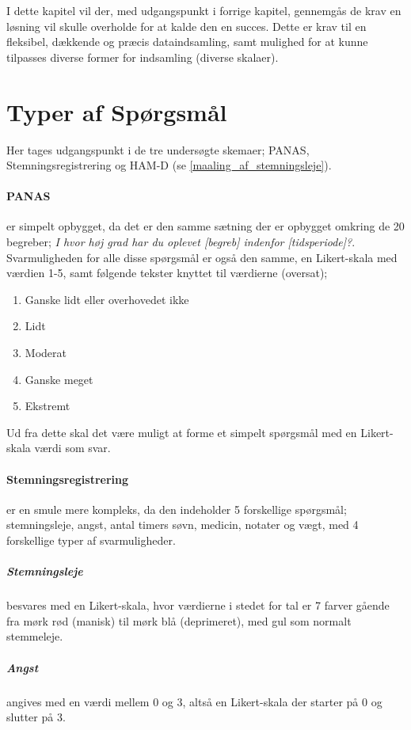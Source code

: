 I dette kapitel vil der, med udgangspunkt i forrige kapitel, gennemgås de krav en løsning vil skulle overholde for at kalde den en succes.
Dette er krav til en fleksibel, dækkende og præcis dataindsamling, samt mulighed for at kunne tilpasses diverse former for indsamling (diverse skalaer).

\section{Typer af Spørgsmål}
Her tages udgangspunkt i de tre undersøgte skemaer; PANAS, Stemningsregistrering og HAM-D (se \cref{maaling_af_stemningsleje}).

\paragraph{PANAS} er simpelt opbygget, da det er den samme sætning der er opbygget omkring de 20 begreber; \textit{I hvor høj grad har du oplevet [begreb] indenfor [tidsperiode]?}.
Svarmuligheden for alle disse spørgsmål er også den samme, en Likert-skala med værdien 1-5, samt følgende tekster knyttet til værdierne (oversat);
\begin{enumerate}
\item Ganske lidt eller overhovedet ikke
\item Lidt
\item Moderat
\item Ganske meget
\item Ekstremt
\end{enumerate}

Ud fra dette skal det være muligt at forme et simpelt spørgsmål med en Likert-skala værdi som svar.

\paragraph{Stemningsregistrering} er en smule mere kompleks, da den indeholder 5 forskellige spørgsmål; stemningsleje, angst, antal timers søvn, medicin, notater og vægt, med 4 forskellige typer af svarmuligheder.

\subparagraph{Stemningsleje} besvares med en Likert-skala, hvor værdierne i stedet for tal er 7 farver gående fra mørk rød (manisk) til mørk blå (deprimeret), med gul som normalt stemmeleje.

\subparagraph{Angst} angives med en værdi mellem 0 og 3, altså en Likert-skala der starter på 0 og slutter på 3.

